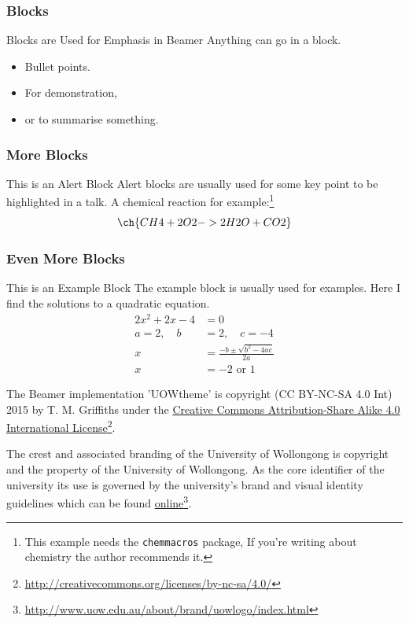 \documentclass[aspectratio=1610]{beamer}
\begin{document}
\begin{frame}
\frametitle{Blocks}
   \begin{block}{Blocks are Used for Emphasis in Beamer}
      Anything can go in a block.
      \begin{itemize}
         \item Bullet points.
         \item For demonstration,
         \item or to summarise something.
      \end{itemize}
   \end{block}
\end{frame}


\begin{frame}
\frametitle{More Blocks}
   \begin{alertblock}{This is an Alert Block}
      Alert blocks are usually used for some key point to be highlighted in a talk.
      A chemical reaction for example:\footnote{This example needs the \texttt{chemmacros} package, If you're writing about chemistry the author recommends it.}
      \begin{equation}
         \ch{CH4 + 2 O2 -> 2 H2O + CO2}
      \end{equation}
   \end{alertblock}
\end{frame}


\begin{frame}
\frametitle{Even More Blocks}
   \begin{exampleblock}{This is an Example Block}
      The example block is usually used for examples. Here I find the solutions to a quadratic equation.
      \begin{align*}
         2x^2 + 2x - 4 & = 0 \\
         a=2, \quad b & =2, \quad c=-4\\
         x & =\frac{-b\pm\sqrt{b^2-4ac}}{2a} \\
         x & =-2 \text{ or } 1
      \end{align*}
   \end{exampleblock}
\end{frame}


\begin{frame}\footnotesize
   The Beamer implementation 'UOWtheme' is copyright (CC BY-NC-SA 4.0 Int) 2015 by T. M. Griffiths under the \href{http://creativecommons.org/licenses/by-sa/4.0/}{Creative Commons Attribution-Share Alike 4.0 International License}\footnote{\url{http://creativecommons.org/licenses/by-nc-sa/4.0/}}.
   
   \begin{center}\ccbysa\end{center}
   
   The crest and associated branding of the University of Wollongong is copyright and the property of the University of Wollongong. As the core identifier of the university its use is governed by the university's brand and visual identity guidelines which can be found \href{http://www.uow.edu.au/about/brand/uowlogo/index.html}{online}\footnote{\url{http://www.uow.edu.au/about/brand/uowlogo/index.html}}.
   
\end{frame}
\end{document}
